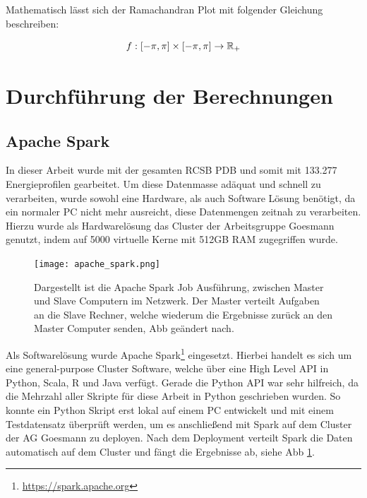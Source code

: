 Mathematisch lässt sich der Ramachandran Plot mit folgender Gleichung beschreiben:

\begin{equation}
    f : [-\pi,\pi]\times[-\pi,\pi] \rightarrow \mathbb{R}_{+}
    \label{eq:rama_eq}
\end{equation}



\section{Durchführung der Berechnungen}


\subsection{Apache Spark}
In dieser Arbeit wurde mit der gesamten RCSB \ac{PDB} und somit mit 133.277 Energieprofilen gearbeitet. Um diese Datenmasse adäquat und schnell zu verarbeiten, wurde sowohl eine Hardware, als auch Software Lösung benötigt, da ein normaler PC nicht mehr ausreicht, diese Datenmengen zeitnah zu verarbeiten. Hierzu wurde als Hardwarelösung das Cluster der Arbeitsgruppe Goesmann genutzt, indem auf 5000 virtuelle Kerne mit 512GB RAM zugegriffen wurde. 

\begin{figure}[H]
\texttt{[image: apache\_spark.png]}
\caption{Dargestellt ist die Apache Spark Job Ausführung, zwischen Master und Slave Computern im Netzwerk. Der Master verteilt Aufgaben an die Slave Rechner, welche wiederum die Ergebnisse zurück an den Master Computer senden, \ac{Abb} geändert nach\protect\footnotemark.}
\label{fig:apache_spark}
\end{figure}

Als Softwarelösung wurde Apache Spark\footnote{\url{https://spark.apache.org}} eingesetzt. Hierbei handelt es sich um eine general-purpose Cluster Software, welche über eine High Level API in Python, Scala, R und Java verfügt. Gerade die Python API war sehr hilfreich, da die Mehrzahl aller Skripte für diese Arbeit in Python geschrieben wurden. So konnte ein Python Skript erst lokal auf einem PC entwickelt und mit einem Testdatensatz überprüft werden, um es anschließend mit Spark auf dem Cluster der AG Goesmann zu deployen. Nach dem Deployment verteilt Spark die Daten automatisch auf dem Cluster und fängt die Ergebnisse ab, siehe \ac{Abb} \ref{fig:apache_spark}. 

